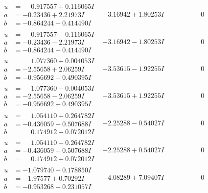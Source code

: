 \documentclass[1p]{elsarticle_modified}
\theoremstyle{definition}
\begin{document}
$$\begin{array}{c|c|c}
\begin{aligned}
u &= \phantom{-}0.917557 + 0.116065 I \\
a &= -0.23436 + 2.21973 I \\
b &= -0.864244 + 0.414490 I\end{aligned}
 & -3.16942 + 1.80253 I & \phantom{-0.000000 } 0 \\ \hline\begin{aligned}
u &= \phantom{-}0.917557 - 0.116065 I \\
a &= -0.23436 - 2.21973 I \\
b &= -0.864244 - 0.414490 I\end{aligned}
 & -3.16942 - 1.80253 I & \phantom{-0.000000 } 0 \\ \hline\begin{aligned}
u &= \phantom{-}1.077360 + 0.004053 I \\
a &= -2.55658 + 2.06259 I \\
b &= -0.956692 - 0.490395 I\end{aligned}
 & -3.53615 - 1.92255 I & \phantom{-0.000000 } 0 \\ \hline\begin{aligned}
u &= \phantom{-}1.077360 - 0.004053 I \\
a &= -2.55658 - 2.06259 I \\
b &= -0.956692 + 0.490395 I\end{aligned}
 & -3.53615 + 1.92255 I & \phantom{-0.000000 } 0 \\ \hline\begin{aligned}
u &= \phantom{-}1.054110 + 0.264782 I \\
a &= -0.436059 - 0.507688 I \\
b &= \phantom{-}0.174912 - 0.072012 I\end{aligned}
 & -2.25288 - 0.54027 I & \phantom{-0.000000 } 0 \\ \hline\begin{aligned}
u &= \phantom{-}1.054110 - 0.264782 I \\
a &= -0.436059 + 0.507688 I \\
b &= \phantom{-}0.174912 + 0.072012 I\end{aligned}
 & -2.25288 + 0.54027 I & \phantom{-0.000000 } 0 \\ \hline\begin{aligned}
u &= -1.079740 + 0.178850 I \\
a &= -1.97577 + 0.70292 I \\
b &= -0.953268 - 0.231057 I\end{aligned}
 & -4.08289 + 7.09407 I & \phantom{-0.000000 } 0 \\ \hline\begin{aligned}

\end{aligned}
\end{array}$$
\end{document}
